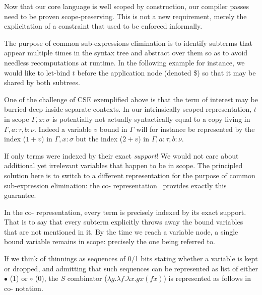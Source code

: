 

Now that our core language is well scoped by construction, our compiler passes
need to be proven scope-preserving.
%
This is not a new requirement, merely the explicitation of a constraint that
used to be enforced informally.


The purpose of common sub-expressions elimination is to identify subterms
that appear multiple times in the syntax tree and abstract over them so
as to avoid needless recomputations at runtime.
%
In the following example for instance, we would like to let-bind $t$ before
the application node (denoted \$) so that it may be shared by both subtrees.

\cseexamplegraph{}

One of the challenge of CSE exemplified above is that the term of interest
may be burried deep inside separate contexts. In our intrinsically scoped
representation, $t$ in scope $\Gamma, x : \sigma$ is potentially not actually
syntactically equal to a copy living in $\Gamma, a : \tau, b : \nu$.
%
Indeed a variable $v$ bound in $\Gamma$ will for instance be represented by
the \DeBruijn{} index ($1+v$) in $\Gamma, x : \sigma$
but the index ($2+v$) in $\Gamma, a :  \tau, b : \nu$.

If only terms were indexed by their exact \emph{support}! We would not care
about additional yet irrelevant variables that happen to be in scope.
%
The principled solution here is to switch to a different representation for
the purpose of common sub-expression elimination: the co-\DeBruijn{}
representation~\cite{DBLP:journals/corr/abs-1807-04085} provides exactly this guarantee.


In the co-\DeBruijn{} representation, every term is precisely indexed by its
exact support.
%
That is to say that every subterm explicitly throws away the bound variables
that are not mentioned in it.
%
By the time we reach a variable node, a single  bound variable remains in scope:
precisely the one being referred to.

If we think of thinnings as sequences of 0/1 bits stating whether a variable
is kept or dropped, and admitting that such sequences can be represented as
list of either $\bullet$ (1) or $\circ$ (0), the $S$ combinator
($\lambda g. \lambda f. \lambda x. g x (f x)$) is represented as follows in
co-\DeBruijn{} notation.

